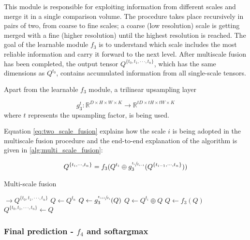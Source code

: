 \documentclass[10pt]{article}
\begin{document}
This module is responsible for exploiting information from different scales and merge it in a single comparison volume. The procedure takes place recursively in pairs of two, from coarse to fine scales; a coarse (low resolution) scale is getting merged with a fine (higher resolution) until the highest resolution is reached. The goal of the learnable module $f_3$ is to understand which scale includes the most reliable information and carry it forward to the next level. After multiscale fusion has been completed, the output tensor $Q^{\{t_0, t_1, \cdot \cdot \cdot, t_n\}}$, which has the same dimensions as $Q^{t_0}$, contains accumulated information from all single-scale tensors. 

Apart from the learnable $f_3$ module, a trilinear upsampling layer 

$$g_3^t: \mathbb{R}^{D \times H \times W \times K} \rightarrow \mathbb{R}^{tD \times tH \times tW \times K}$$ where $t$ represents the upsampling factor, is being used. 

Equation \ref{eq:two_scale_fusion} explains how the scale $i$ is being adopted in the multiscale fusion procedure and the end-to-end explanation of the algorithm is given in \ref{alg:multi_scale_fusion}:

\begin{equation} \label{eq:two_scale_fusion}
Q^{ \{ t_i, \cdot \cdot \cdot, t_{n} \} } = f_3(Q^{t_i} \oplus g_3^{\sfrac{t_i}{t_{i-1}} }(Q^{ \{ t_{i-1}, \cdot \cdot \cdot, t_n \} }))
\end{equation}


\begin{algorithm}
\caption{Multi-scale fusion}\label{alg:multi_scale_fusion}
\begin{algorithmic}[1]
 $\rightarrow Q^{\{t_0, t_1, \cdot \cdot \cdot, t_n\}}$ 
\State $Q \gets Q^{t_n}$ 
\State $Q \gets g_3^{\sfrac{ t_{i+1} }{ t_i } }(Q)$ 
\State $Q \gets Q^{t_i} \oplus Q$ 
\State $Q \gets f_3(Q)$ 
\EndFor
\State \Return $Q^{\{t_0, t_1, \cdot \cdot \cdot, t_n\}} \gets Q$ 
\EndProcedure
\end{algorithmic}
\end{algorithm}


\subsubsection{Final prediction - $f_4$ and softargmax}
\end{document}
